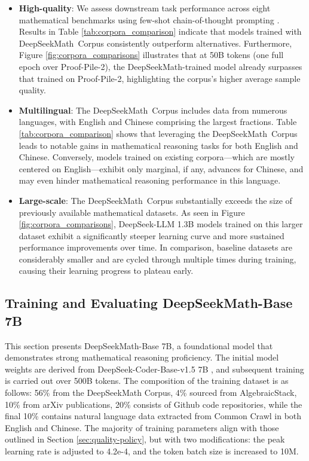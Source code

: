 \begin{itemize}[topsep=0pt]
    \item \textbf{High-quality}:
    We assess downstream task performance across eight mathematical benchmarks using few-shot chain-of-thought prompting \cite{cot}. Results in Table \ref{tab:corpora_comparison} indicate that models trained with DeepSeekMath~Corpus consistently outperform alternatives. Furthermore, Figure \ref{fig:corpora_comparisons} illustrates that at 50B tokens (one full epoch over Proof-Pile-2), the DeepSeekMath-trained model already surpasses that trained on Proof-Pile-2, highlighting the corpus’s higher average sample quality.
    \item \textbf{Multilingual}:
    The DeepSeekMath~Corpus includes data from numerous languages, with English and Chinese comprising the largest fractions. Table \ref{tab:corpora_comparison} shows that leveraging the DeepSeekMath~Corpus leads to notable gains in mathematical reasoning tasks for both English and Chinese. Conversely, models trained on existing corpora—which are mostly centered on English—exhibit only marginal, if any, advances for Chinese, and may even hinder mathematical reasoning performance in this language.
    \item \textbf{Large-scale}:
    The DeepSeekMath~Corpus substantially exceeds the size of previously available mathematical datasets. As seen in Figure \ref{fig:corpora_comparisons}, DeepSeek-LLM 1.3B models trained on this larger dataset exhibit a significantly steeper learning curve and more sustained performance improvements over time. In comparison, baseline datasets are considerably smaller and are cycled through multiple times during training, causing their learning progress to plateau early.
\end{itemize}

\subsection{Training and Evaluating DeepSeekMath-Base 7B}

This section presents DeepSeekMath-Base 7B, a foundational model that demonstrates strong mathematical reasoning proficiency. The initial model weights are derived from DeepSeek-Coder-Base-v1.5 7B \citep{deepseek-coder}, and subsequent training is carried out over 500B tokens. The composition of the training dataset is as follows: 56\% from the DeepSeekMath Corpus, 4\% sourced from AlgebraicStack, 10\% from arXiv publications, 20\% consists of Github code repositories, while the final 10\% contains natural language data extracted from Common Crawl in both English and Chinese. The majority of training parameters align with those outlined in Section \ref{sec:quality-policy}, but with two modifications: the peak learning rate is adjusted to 4.2e-4, and the token batch size is increased to 10M.

